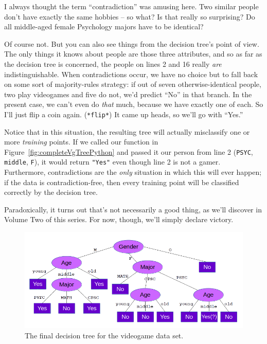 I always thought the term ``contradiction'' was amusing here. Two similar
people don't have exactly the same hobbies -- so what? Is that really so
surprising? Do all middle-aged female Psychology majors have to be identical?

Of course not. But you can also see things from the decision tree's point of
view. The only things it knows about people are those three attributes, and so
as far as the decision tree is concerned, the people on lines 2 and 16 really
\textit{are} indistinguishable. When contradictions occur, we have no choice
but to fall back on some sort of majority-rules strategy: if out of seven
otherwise-identical people, two play videogames and five do not, we'd predict
``No'' in that branch. In the present case, we can't even do \textit{that}
much, because we have exactly one of each. So I'll just flip a coin again.
(\texttt{*flip*}) It came up heads, so we'll go with ``Yes.''

Notice that in this situation, the resulting tree will actually misclassify one
or more \textit{training} points. If we called our function in
Figure~\ref{fig:completeVgTreePython} and passed it our person from line 2
(\texttt{\textquotesingle PSYC\textquotesingle}, \texttt{\textquotesingle
middle\textquotesingle}, \texttt{\textquotesingle F\textquotesingle}), it would
return \texttt{"Yes"} even though line 2 is not a gamer. Furthermore,
contradictions are the \textit{only} situation in which this will ever happen;
if the data is contradiction-free, then every training point will be classified
correctly by the decision tree.

Paradoxically, it turns out that's not necessarily a good thing, as we'll
discover in Volume Two of this series. For now, though, we'll simply declare
victory.

\begin{figure}[ht]
\centering
\includegraphics[width=1\textwidth]{completeVgTree.png}
\caption{The final decision tree for the videogame data set.}
\label{fig:completeVgTree}
\end{figure}

